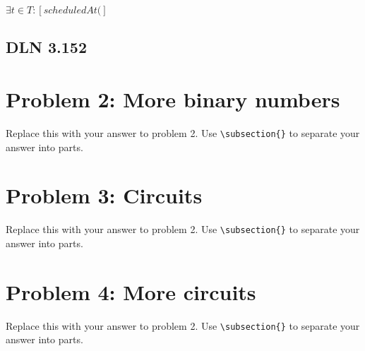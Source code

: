 \documentclass[titlepage]{article}
\begin{document}
\( \exists t \in T: \left[ scheduledAt(   \right] \)

\subsection{DLN 3.152} 



\section{Problem 2: More binary numbers}

Replace this with your answer to problem 2.  Use \verb|\subsection{}| to separate your answer into parts.

\section{Problem 3: Circuits}

Replace this with your answer to problem 2.  Use \verb|\subsection{}| to separate your answer into parts.

\section{Problem 4: More circuits}

Replace this with your answer to problem 2.  Use \verb|\subsection{}| to separate your answer into parts.
\end{document}
